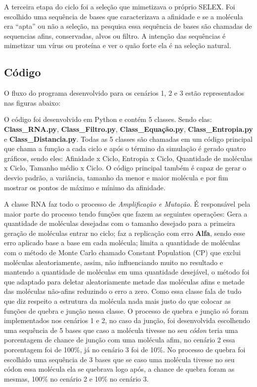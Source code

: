 A terceira etapa do ciclo foi a seleção que mimetizava o próprio SELEX. Foi
escolhido uma sequência de bases que caracterizava a afinidade e se a molécula era “apta”
ou não a seleção, na pesquisa essa sequência de bases são chamadas de sequencias afins,
conservadas, alvos ou filtro. A intenção das sequências é mimetizar um vírus ou proteína
e ver o quão forte ela é na seleção natural.

\subsection{Código}

O fluxo do programa desenvolvido para os cenários 1, 2 e 3 estão representados nas
figuras abaixo:


O código foi desenvolvido em Python e contém 5 classes. Sendo elas:\\
\textbf{Class\_RNA.py}, \textbf{Class\_Filtro.py}, \textbf{Class\_Equação.py}, \textbf{Class\_Entropia.py} e
\textbf{Class\_Distancia.py}. Todas as 5 classes são chamadas em um código principal que chama a função a cada ciclo e após o término da simulação é gerado quatro gráficos, sendo eles: Afinidade x Ciclo, Entropia x Ciclo, Quantidade de moléculas x Ciclo, Tamanho médio x Ciclo. O código principal também é capaz de gerar o desvio padrão, a
variância, tamanho da menor e maior molécula e por fim mostrar os pontos de máximo e mínimo da afinidade.

A classe RNA faz todo o processo de \emph{Amplificação e Mutação}. É responsável pela
maior parte do processo tendo funções que fazem as seguintes operações: Gera a
quantidade de moléculas desejadas com o tamanho desejado para a primeira geração de
moléculas entrar no ciclo; faz a replicação com erro \textbf{Alfa}, sendo esse erro aplicado base
a base em cada molécula; limita a quantidade de moléculas com o método de Monte Carlo
chamado Constant Population (CP) que exclui moléculas aleatoriamente, assim, não
influenciando muito no resultado e mantendo a quantidade de moléculas em uma
quantidade desejável, o método foi que adaptado para deletar aleatoriamente metade das
moléculas afins e metade das moléculas não-afins reduzindo o erro a zero. Como essa
classe fala de tudo que diz respeito a estrutura da molécula nada mais justo do que colocar
as funções de quebra e junção nessa classe. O processo de quebra e junção só foram
implementados nos cenários 1 e 2, no caso da junção, foi desenvolvida escolhendo uma
sequência de 5 bases que caso a molécula tivesse no seu \emph{códon} teria uma porcentagem de
chance de junção com uma molécula afim, no cenário 2 essa porcentagem foi de 100\%,
já no cenário 3 foi de 10\%. No processo de quebra foi escolhido uma sequência de 3 bases
que se caso uma molécula tivesse no seu códon essa molécula ela se quebrava logo após,
a chance de quebra foram as mesmas, 100\% no cenário 2 e 10\% no cenário 3.

